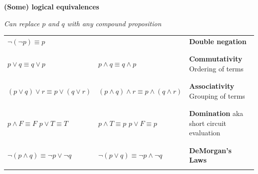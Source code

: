\documentclass[12pt, oneside]{article}
\begin{document}
{\bf (Some) logical equivalences}

{\it Can replace $p$ and $q$ with any compound proposition}

\begin{tabular}{llp{3in}}
$\lnot ( \lnot p) \equiv p$ & & {\bf Double negation}\\
&& \\
&& \\
$p \lor q \equiv q \lor p$ & $p \land q \equiv q \land p$ & {\bf Commutativity} Ordering of terms\\
&& \\
&& \\
$(p \lor q) \lor r  \equiv p \lor (q \lor r)$ & $(p \land q) \land r  \equiv p \land (q \land r)$ & {\bf Associativity} Grouping of terms\\
&& \\
&& \\
$p \land F \equiv F$ \qquad $p \lor T \equiv T$ & $p \land T \equiv p$ \qquad $p \lor F \equiv p$ & {\bf Domination} aka 
short circuit evaluation\\
&& \\
&& \\
$\lnot (p \land q) \equiv \lnot p \lor \lnot q$ & $\lnot (p \lor q) \equiv \lnot p \land\lnot q$  & {\bf DeMorgan's Laws}\\
&& \\
\end{tabular}
 
\end{document}

